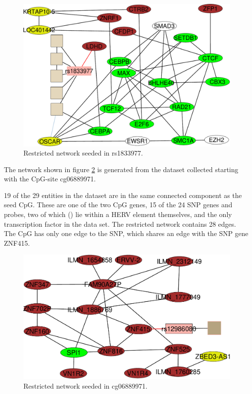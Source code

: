\documentclass[a4paper,12pt,twoside,openright]{report}
\begin{document}
\begin{figure}[tb]
	\includegraphics[scale = 0.6, keepaspectratio = true]{"../figures/rs1833977"}  
	\caption{Restricted network seeded in rs1833977. }
    \label{fig:rs1833977.ggm.network}
\end{figure}



The network shown in figure \ref{fig:cg06889971.ggm.network} is generated from the dataset collected starting with the CpG-site cg06889971. 

19 of the 29 entities in the dataset are in the same connected component as the seed CpG. These are one of the two CpG genes, 15 of the 24 SNP genes and probes, two of which () lie within a HERV element themselves, and the only transcription factor in the data set. The restricted network contains 28 edges. The CpG has only one edge to the SNP, which shares an edge with the SNP gene ZNF415. 
\begin{figure}[tb]
	\includegraphics[scale = 0.6, keepaspectratio = true]{"../figures/cg06889971"}  
	\caption{Restricted network seeded in cg06889971. }
    \label{fig:cg06889971.ggm.network}
\end{figure}
\end{document}
